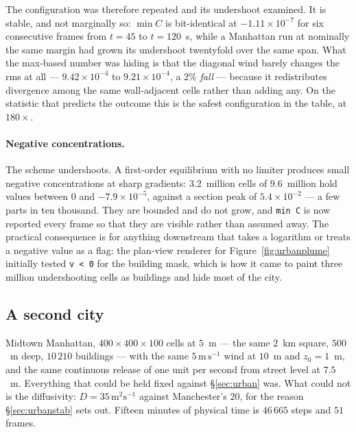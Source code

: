 \documentclass[11pt,a4paper]{article}
\begin{document}
The configuration was therefore repeated and its undershoot examined. It is
stable, and not marginally so: $\min C$ is bit-identical at $-1.11\times10^{-7}$
for six consecutive frames from $t=45$ to $t=120$~s, while a Manhattan run at
nominally the same margin had grown its undershoot twentyfold over the same span.
What the max-based number was hiding is that the diagonal wind barely changes the
rms at all --- $9.42\times10^{-4}$ to $9.21\times10^{-4}$, a $2\%$ \emph{fall} ---
because it redistributes divergence among the same wall-adjacent cells rather
than adding any. On the statistic that predicts the outcome this is the safest
configuration in the table, at $180\times$.

\paragraph{Negative concentrations.} The scheme undershoots. A first-order
equilibrium with no limiter produces small negative concentrations at sharp
gradients: $3.2$~million cells of $9.6$~million hold values between $0$ and
$-7.9\times10^{-5}$, against a section peak of $5.4\times10^{-2}$ --- a few
parts in ten thousand. They are bounded and do not grow, and \texttt{min C} is
now reported every frame so that they are visible rather than assumed away. The
practical consequence is for anything downstream that takes a logarithm or
treats a negative value as a flag: the plan-view renderer for
Figure~\ref{fig:urbanplume} initially tested \texttt{v < 0} for the building
mask, which is how it came to paint three million undershooting cells as
buildings and hide most of the city.

\subsection{A second city}
\label{sec:urbannyc}

Midtown Manhattan, $400\times400\times100$ cells at $5$~m --- the same $2$~km
square, $500$~m deep, $10\,210$ buildings --- with the same
$5\,\mathrm{m\,s^{-1}}$ wind at $10$~m and $z_0=1$~m, and the same continuous
release of one unit per second from street level at $7.5$~m. Everything that
could be held fixed against \S\ref{sec:urban} was. What could not is the
diffusivity: $D=35\,\mathrm{m^2s^{-1}}$ against Manchester's $20$, for the
reason \S\ref{sec:urbanstab} sets out. Fifteen minutes of physical time is
$46\,665$ steps and $51$ frames.
\end{document}
